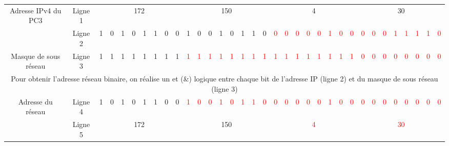 \documentclass[11pt,a4paper,landscape]{article}
\begin{document}
\begin{tabular}{|c|c||c|c|c|c|c|c|c|c||c|c|c|c|c|c|c|c||c|c|c|c|c|c|c|c||c|c|c|c|c|c|c|c||}
    \hline
    \multirow{2}{*}{Adresse IPv4  du PC3} & Ligne 1 & \multicolumn{8}{|c||}{172} & \multicolumn{8}{|c||}{150} & \multicolumn{8}{|c||}{4} & \multicolumn{8}{|c||}{30} \\
    \cline{2-34}
    & Ligne 2 & 1 & 0 & 1 & 0 & 1 & 1 &  0 & 0 & 1 & 0 & 0 & 1 & 0 & 1 & 1 & 0 & \textcolor{red}{0} &\textcolor{red}{0} & \textcolor{red}{0} & \textcolor{red}{0}&  \textcolor{red}{0}  & \textcolor{red}{1} & \textcolor{red}{0} & \textcolor{red}{0} & \textcolor{red}{0} &  \textcolor{red}{0} & \textcolor{red}{0}& \textcolor{red}{1} & \textcolor{red}{1} & \textcolor{red}{1} & \textcolor{red}{1} & \textcolor{red}{0}   \\
    \hline
    Masque de sous réseau & Ligne 3 & 1 & 1 & 1 & 1 & 1 & 1& 1 & 1 & \textcolor{red}{1} & \textcolor{red}{1} & \textcolor{red}{1} & \textcolor{red}{1} & \textcolor{red}{1} & \textcolor{red}{1} & \textcolor{red}{1} & \textcolor{red}{1} & \textcolor{red}{1} & \textcolor{red}{1} & \textcolor{red}{1} & \textcolor{red}{1} & \textcolor{red}{1} & \textcolor{red}{1} & \textcolor{red}{1} & \textcolor{red}{1}  & \textcolor{red}{0} & \textcolor{red}{0} & \textcolor{red}{0} & \textcolor{red}{0} & \textcolor{red}{0} &\textcolor{red}{0} & \textcolor{red}{0} & \textcolor{red}{0}\\
    \hline
    \multicolumn{34}{|c|}{Pour obtenir l'adresse réseau binaire, on réalise un {\sc et} (\&) logique entre chaque bit de l'adresse IP (ligne 2) et du masque de sous réseau (ligne 3)}\\
    \hline
    \multirow{2}{*}{Adresse du réseau} & Ligne 4 & 1 & 0 & 1 & 0 & 1 & 1 & 0 & 0 & \textcolor{red}{1} & \textcolor{red}{0} & \textcolor{red}{0} & \textcolor{red}{1} & \textcolor{red}{0} & \textcolor{red}{1} & \textcolor{red}{1} & \textcolor{red}{0} & \textcolor{red}{0} &\textcolor{red}{0} & \textcolor{red}{0} & \textcolor{red}{0}&  \textcolor{red}{0}  & \textcolor{red}{1} & \textcolor{red}{0} & \textcolor{red}{0} & \textcolor{red}{0} & \textcolor{red}{0} & \textcolor{red}{0} & \textcolor{red}{0} & \textcolor{red}{0} & \textcolor{red}{0} & \textcolor{red}{0} & \textcolor{red}{0} \\
    \cline{2-34}
     & Ligne 5 & \multicolumn{8}{|c||}{172} & \multicolumn{8}{|c||}{150} & \multicolumn{8}{|c||}{\textcolor{red}{4}} & \multicolumn{8}{|c||}{\textcolor{red}{30}} \\
    \hline
\end{tabular}
\end{document}
